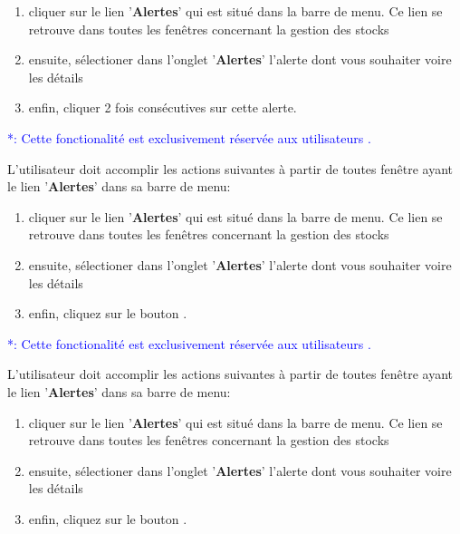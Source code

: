 \begin{enumerate}[1)]
	\item cliquer sur le lien '\textbf{Alertes}' qui est situ\'e
	dans la barre de menu. Ce lien se retrouve dans toutes les
	fen\^etres concernant la gestion des stocks
		
	\item ensuite, s\'electioner dans l'onglet '\textbf{Alertes}'
		l'alerte dont vous souhaiter voire les d\'etails

	\item enfin, cliquer 2 fois cons\'ecutives sur cette alerte.	
\end{enumerate}



\textcolor{blue}{*: Cette fonctionalit\'e est exclusivement
	r\'eserv\'ee aux utilisateurs \manager.}

L'utilisateur doit accomplir les actions suivantes \`a
partir de toutes fen\^etre ayant le lien '\textbf{Alertes}'
dans sa barre de menu:

\begin{enumerate}[1)]
	\item cliquer sur le lien '\textbf{Alertes}' qui est situ\'e
	dans la barre de menu. Ce lien se retrouve dans toutes les
	fen\^etres concernant la gestion des stocks
		
	\item ensuite, s\'electioner dans l'onglet '\textbf{Alertes}'
		l'alerte dont vous souhaiter voire les d\'etails

	\item enfin, cliquez sur le bouton .	
\end{enumerate}

\newpage
{}

\textcolor{blue}{*: Cette fonctionalit\'e est exclusivement
		r\'eserv\'ee aux utilisateurs \manager.}

L'utilisateur doit accomplir les actions suivantes \`a
partir de toutes fen\^etre ayant le lien '\textbf{Alertes}'
dans sa barre de menu:

\begin{enumerate}[1)]
	\item cliquer sur le lien '\textbf{Alertes}' qui est situ\'e
	dans la barre de menu. Ce lien se retrouve dans toutes les
	fen\^etres concernant la gestion des stocks
		
	\item ensuite, s\'electioner dans l'onglet '\textbf{Alertes}'
		l'alerte dont vous souhaiter voire les d\'etails

	\item enfin, cliquez sur le bouton .
\end{enumerate}
